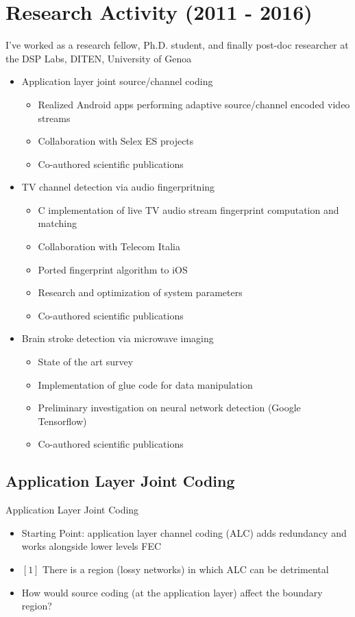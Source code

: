 \documentclass{if-beamer}
\begin{document}
\section{Research Activity (2011 - 2016)}

\begin{frame}
I've worked as a research fellow, Ph.D. student, and finally post-doc researcher at the DSP Labs, DITEN, University of Genoa

\begin{itemize}
\item Application layer joint source/channel coding
\begin{itemize}
\item Realized Android apps performing adaptive source/channel encoded video streams
\item Collaboration with Selex ES projects
\item Co-authored scientific publications
\end{itemize}
\item TV channel detection via audio fingerpritning
\begin{itemize}
\item C implementation of live TV audio stream fingerprint computation and matching
\item Collaboration with Telecom Italia
\item Ported fingerprint algorithm to iOS
\item Research and optimization of system parameters
\item Co-authored scientific publications
\end{itemize}
\item Brain stroke detection via microwave imaging
\begin{itemize}
\item State of the art survey
\item Implementation of glue code for data manipulation
\item Preliminary investigation on neural network detection (Google Tensorflow)
\item Co-authored scientific publications
\end{itemize}
\end{itemize}
\end{frame}

\iffalse
\subsection{Application Layer Joint Coding}
\begin{frame}
Application Layer Joint Coding


\begin{itemize}
\item Starting Point: application layer channel coding (ALC) adds redundancy and works alongside lower levels FEC
\item $[1]$ There is a region (lossy networks) in which ALC can be detrimental
\item How would source coding (at the application layer) affect the boundary region?
\end{itemize}
\end{frame}
\end{document}
